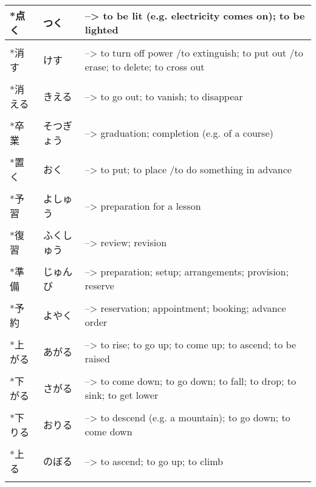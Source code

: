 \documentclass{article}
\begin{document}
\begin{tabular}{ l | l p{13cm} }
*点く&つく&--> to be lit (e.g. electricity comes on); to be lighted \\ \hline\\[-1em]
*消す&けす&--> to turn off power /to extinguish; to put out /to erase; to delete; to cross out \\ \hline\\[-1em]
*消える&きえる&--> to go out; to vanish; to disappear \\ \hline\\[-1em]
*卒業&そつぎょう&--> graduation; completion (e.g. of a course) \\ \hline\\[-1em]
*置く&おく&--> to put; to place /to do something in advance \\ \hline\\[-1em]
*予習&よしゅう&--> preparation for a lesson \\ \hline\\[-1em]
*復習&ふくしゅう&--> review; revision \\ \hline\\[-1em]
*準備&じゅんび&--> preparation; setup; arrangements; provision; reserve \\ \hline\\[-1em]
*予約&よやく&--> reservation; appointment; booking; advance order \\ \hline\\[-1em]
*上がる&あがる&--> to rise; to go up; to come up; to ascend; to be raised \\ \hline\\[-1em]
*下がる&さがる&--> to come down; to go down; to fall; to drop; to sink; to get lower \\ \hline\\[-1em]
*下りる&おりる&--> to descend (e.g. a mountain); to go down; to come down \\ \hline\\[-1em]
*上る&のぼる&--> to ascend; to go up; to climb \\ \hline\\[-1em]
\end{tabular}
\end{document}
